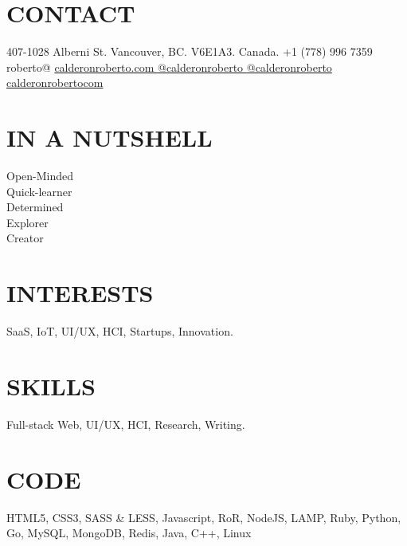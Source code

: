 \documentclass[full]{rvca}
\begin{document}

\begin{aside} %
\section{\uppercase{contact} }
407-1028 Alberni St.
Vancouver, BC.
V6E1A3. Canada.
+1 (778) 996 7359
\ghost
roberto@
\href{http://calderonroberto.com}{\color{sidebandtextcolor}calderonroberto.com \faGlobe}
\href{http://twitter.com/calderonroberto}{\color{sidebandtextcolor}@calderonroberto \faTwitter} 
\href{https://github.com/calderonroberto}{\color{sidebandtextcolor}@calderonroberto \faGithub} 
\href{https://ca.linkedin.com/in/calderonrobertocom}{\color{sidebandtextcolor}calderonrobertocom \faLinkedin} 
\ghost
\ghost
\section{\uppercase{in a nutshell}}
Open-Minded\\Quick-learner\\Determined\\Explorer\\Creator 
% 
\ghost
\section{\uppercase{interests}}
SaaS, IoT, UI/UX, HCI, Startups, Innovation.
%
\ghost
\section{\uppercase{skills}}
Full-stack Web, UI/UX, 
HCI, Research, Writing.
% 
\ghost
\section{\uppercase{code}}
HTML5, CSS3, SASS \& LESS, {\scriptsize\faHeart} Javascript, 
{\scriptsize\faHeart} RoR, {\scriptsize\faHeart} NodeJS, LAMP,
{\scriptsize\faHeart} Ruby, Python, {\scriptsize\faHeart} Go,
MySQL, MongoDB, Redis,
Java, C++, {\scriptsize\faHeart} Linux
\end{aside}


\end{document}
